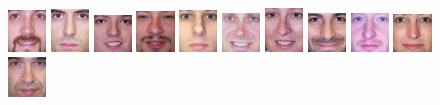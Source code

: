\begin{figure}[H]
\includegraphics[width=0.09\textwidth]{img/fdResult1/output28.png}
\includegraphics[width=0.09\textwidth]{img/fdResult1/output32.png}
\includegraphics[width=0.09\textwidth]{img/fdResult1/output38.png}
\includegraphics[width=0.09\textwidth]{img/fdResult1/output39.png}
\includegraphics[width=0.09\textwidth]{img/fdResult1/output42.png}
\includegraphics[width=0.09\textwidth]{img/fdResult1/output44.png}
\includegraphics[width=0.09\textwidth]{img/fdResult1/output45.png}
\includegraphics[width=0.09\textwidth]{img/fdResult1/output49.png}
\includegraphics[width=0.09\textwidth]{img/fdResult1/output50.png}
\includegraphics[width=0.09\textwidth]{img/fdResult1/output55.png}
\includegraphics[width=0.09\textwidth]{img/fdResult1/output63.png}

\end{figure}

